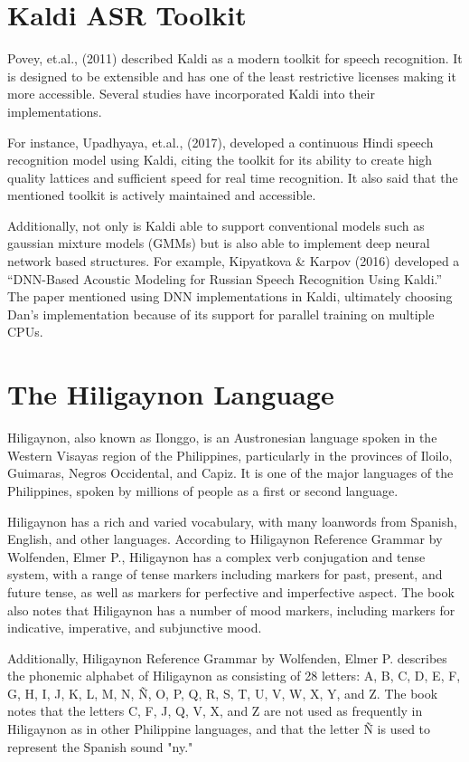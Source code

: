 \section{Kaldi ASR Toolkit}
Povey, et.al., (2011) described Kaldi as a modern toolkit for speech recognition. It is designed to be extensible and has one of the least restrictive licenses making it more accessible. Several studies have incorporated Kaldi into their implementations. 

For instance, Upadhyaya, et.al., (2017), developed a continuous Hindi speech recognition model using Kaldi, citing the toolkit for its ability to create high quality lattices and sufficient speed for real time recognition. It also said that the mentioned toolkit is actively maintained and accessible. 

Additionally, not only is Kaldi able to support conventional models such as gaussian mixture models (GMMs) but is also able to implement deep neural network based structures. For example, Kipyatkova \& Karpov (2016) developed a “DNN-Based Acoustic Modeling for Russian Speech Recognition Using Kaldi.” The paper mentioned using DNN implementations in Kaldi, ultimately choosing Dan’s implementation because of its support for parallel training on multiple CPUs.


\section{The Hiligaynon Language}
Hiligaynon, also known as Ilonggo, is an Austronesian language spoken in the Western Visayas region of the Philippines, particularly in the provinces of Iloilo, Guimaras, Negros Occidental, and Capiz. It is one of the major languages of the Philippines, spoken by millions of people as a first or second language.

Hiligaynon has a rich and varied vocabulary, with many loanwords from Spanish, English, and other languages. According to Hiligaynon Reference Grammar by Wolfenden, Elmer P., Hiligaynon has a complex verb conjugation and tense system, with a range of tense markers including markers for past, present, and future tense, as well as markers for perfective and imperfective aspect. The book also notes that Hiligaynon has a number of mood markers, including markers for indicative, imperative, and subjunctive mood.

Additionally, Hiligaynon Reference Grammar by Wolfenden, Elmer P. describes the phonemic alphabet of Hiligaynon as consisting of 28 letters: A, B, C, D, E, F, G, H, I, J, K, L, M, N, Ñ, O, P, Q, R, S, T, U, V, W, X, Y, and Z. The book notes that the letters C, F, J, Q, V, X, and Z are not used as frequently in Hiligaynon as in other Philippine languages, and that the letter Ñ is used to represent the Spanish sound "ny."

















